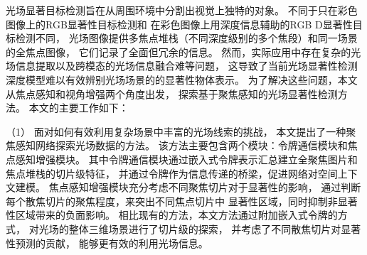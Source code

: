 





%
%
%
%
%
%
%






光场显著目标检测旨在从周围环境中分割出视觉上独特的对象。
不同于只在彩色图像上的RGB显著性目标检测和
在彩色图像上用深度信息辅助的RGB D显著性目标检测不同，
光场图像提供多焦点堆栈（不同深度级别的多个焦段）和同一场景的全焦点图像，
它们记录了全面但冗余的信息。
然而，实际应用中存在复杂的光场信息提取以及跨模态的光场信息融合难等问题，
这导致了当前光场显著性检测深度模型难以有效辨别光场场景的的显著性物体表示。
为了解决这些问题，本文从焦点感知和视角增强两个角度出发，
探索基于聚焦感知的光场显著性检测方法。
本文的主要工作如下：




%
%
（1）
%
%
面对如何有效利用复杂场景中丰富的光场线索的挑战，
本文提出了一种聚焦感知网络探索光场数据的方法。
%
%
该方法主要包含两个模块：令牌通信模块和焦点感知增强模块。
%
%
其中令牌通信模块通过嵌入式令牌表示汇总建立全聚焦图片和焦点堆栈的切片级特征，
并通过令牌作为信息传递的桥梁，促进网络对空间上下文建模。
%
%
焦点感知增强模块充分考虑不同聚焦切片对于显著性的影响，
通过判断每个散焦切片的聚焦程度，来突出不同焦点切片中
显著性区域，同时抑制非显著性区域带来的负面影响。
%
%
相比现有的方法，本文方法通过附加嵌入式令牌的方式，
对光场的整体三维场景进行了切片级的探索，
并考虑了不同散焦切片对显著性预测的贡献，
能够更有效的利用光场信息。


